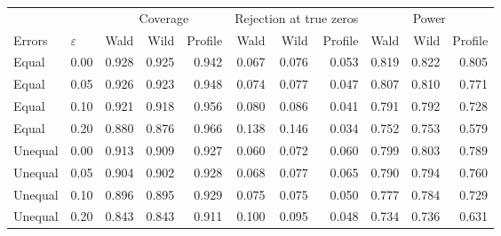 \begin{tabular}{llrrrrrrrrr}
\toprule
& & \multicolumn{3}{c}{Coverage} & \multicolumn{3}{c}{Rejection at true zeros} & \multicolumn{3}{c}{Power} \\
\cmidrule(lr){3-5}\cmidrule(lr){6-8}\cmidrule(lr){9-11}
Errors & $\varepsilon$ & Wald & Wild & Profile & Wald & Wild & Profile & Wald & Wild & Profile \\
\midrule
Equal & 0.00 & 0.928 & 0.925 & 0.942 & 0.067 & 0.076 & 0.053 & 0.819 & 0.822 & 0.805 \\
Equal & 0.05 & 0.926 & 0.923 & 0.948 & 0.074 & 0.077 & 0.047 & 0.807 & 0.810 & 0.771 \\
Equal & 0.10 & 0.921 & 0.918 & 0.956 & 0.080 & 0.086 & 0.041 & 0.791 & 0.792 & 0.728 \\
Equal & 0.20 & 0.880 & 0.876 & 0.966 & 0.138 & 0.146 & 0.034 & 0.752 & 0.753 & 0.579 \\
\midrule
Unequal & 0.00 & 0.913 & 0.909 & 0.927 & 0.060 & 0.072 & 0.060 & 0.799 & 0.803 & 0.789 \\
Unequal & 0.05 & 0.904 & 0.902 & 0.928 & 0.068 & 0.077 & 0.065 & 0.790 & 0.794 & 0.760 \\
Unequal & 0.10 & 0.896 & 0.895 & 0.929 & 0.075 & 0.075 & 0.050 & 0.777 & 0.784 & 0.729 \\
Unequal & 0.20 & 0.843 & 0.843 & 0.911 & 0.100 & 0.095 & 0.048 & 0.734 & 0.736 & 0.631 \\
\bottomrule
\end{tabular}

